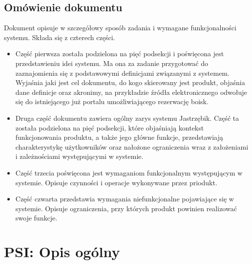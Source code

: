 \documentclass[a4paper,11pt]{article}
\begin{document}
\subsection {Omówienie dokumentu}
Dokument opisuje w szczegółowy sposób zadania i wymagane funkcjonalności systemu. Składa się z czterech części.
\begin{itemize}
	\item Część pierwsza  została podzielona na pięć podsekcji i poświęcona jest przedstawieniu idei systemu. Ma ona za zadanie przygotować do zaznajomienia się z podstawowymi definicjami związanymi z systemem. Wyjaśnia jaki jest cel dokumentu, do kogo skierowany jest produkt, objaśnia dane definicje oraz akronimy, na przykładzie źródła elektronicznego odwołuje się do istniejącego już portalu umożliwiającego rezerwację boisk. 
	\item Druga część dokumentu zawiera ogólny zarys systemu Jastrzębik. Część ta została podzielona na pięć podsekcji, które objaśniają kontekst funkcjonowania produktu, a także jego główne funkcje, przedstawiają charakterystykę użytkowników oraz nałożone ograniczenia wraz z założeniami i zależnościami występującymi w systemie.
	\item Część trzecia poświęcona jest wymaganiom funkcjonalnym występującym w systemie. Opisuje czynności i operacje wykonywane przez priodukt.
	\item Część czwarta przedstawia wymagania niefunkcjonalne pojawiające się w systemie. Opisuje ograniczenia, przy których produkt powinien realizować swoje funkcje.
\end{itemize}

\section {PSI: Opis ogólny}
\end{document}

